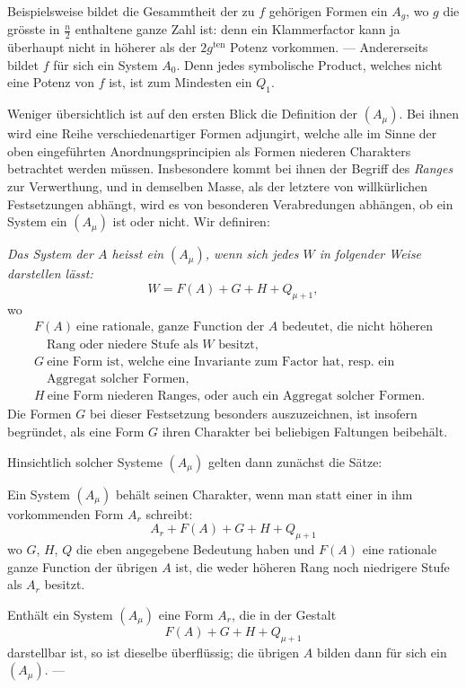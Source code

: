 \documentclass[10pt]{article}
\begin{document}
Beispielsweise bildet die Gesammtheit der zu $f$ gehörigen Formen ein $A_g$, wo $g$ die grösste in $\frac n2$ enthaltene ganze Zahl ist: denn ein Klammerfactor kann ja überhaupt nicht in höherer als der $2g^{\mathrm{ten}}$ Potenz vorkommen. --- Andererseits bildet $f$ für sich ein System $A_0$. Denn jedes symbolische Product, welches nicht eine Potenz von $f$ ist, ist zum Mindesten ein $Q_1$.

Weniger übersichtlich ist auf den ersten Blick die Definition der $(A_\mu)$. Bei ihnen wird eine Reihe verschiedenartiger Formen adjungirt, welche alle im Sinne der oben eingeführten Anordnungsprincipien als Formen niederen Charakters betrachtet werden müssen. Insbesondere kommt bei ihnen der Begriff des \emph{Ranges} zur Verwerthung, und in demselben Masse, als der letztere von willkürlichen Festsetzungen abhängt, wird es von besonderen Verabredungen abhängen, ob ein System ein $(A_\mu)$ ist oder nicht. Wir definiren:

\emph{Das System der $A$ heisst ein $(A_\mu)$, wenn sich jedes $W$ in folgender Weise darstellen lässt:}
\[
W=F(A)+G+H+Q_{\mu+1},
\]
wo
\[
\begin{array}{l}
F(A)\ \text{eine rationale, ganze Function der }A\text{ bedeutet, die nicht höheren}\\
\quad\text{Rang oder niedere Stufe als }W\text{ besitzt},\\[0.15em]
G\ \text{eine Form ist, welche eine Invariante zum Factor hat, resp. ein}\\
\quad\text{Aggregat solcher Formen},\\[0.15em]
H\ \text{eine Form niederen Ranges, oder auch ein Aggregat solcher Formen.}
\end{array}
\]
Die Formen $G$ bei dieser Festsetzung besonders auszuzeichnen, ist insofern begründet, als eine Form $G$ ihren Charakter bei beliebigen Faltungen beibehält.

Hinsichtlich solcher Systeme $(A_\mu)$ gelten dann zunächst die Sätze:

Ein System $(A_\mu)$ behält seinen Charakter, wenn man statt einer in ihm vorkommenden Form $A_r$ schreibt:
\[
A_r+F(A)+G+H+Q_{\mu+1}
\]
wo $G$, $H$, $Q$ die eben angegebene Bedeutung haben und $F(A)$ eine rationale ganze Function der übrigen $A$ ist, die weder höheren Rang noch niedrigere Stufe als $A_r$ besitzt.

Enthält ein System $(A_\mu)$ eine Form $A_r$, die in der Gestalt
\[
F(A)+G+H+Q_{\mu+1}
\]
darstellbar ist, so ist dieselbe überflüssig; die übrigen $A$ bilden dann für sich ein $(A_\mu)$. ---
\end{document}
